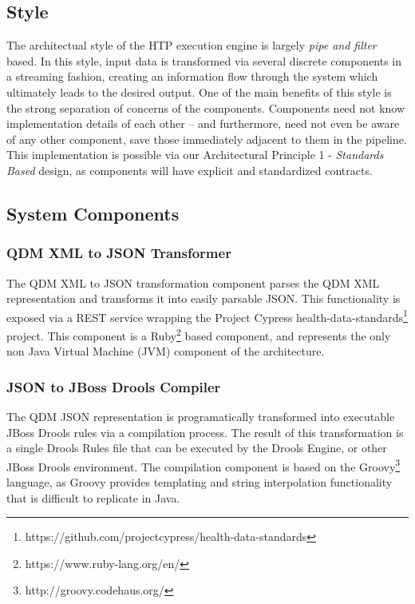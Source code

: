 \documentclass{amia}
\begin{document}
\subsection*{Style}
The architectual style of the HTP execution engine is largely \textit{pipe and filter} based. In this style, input data is transformed via several discrete components in a streaming fashion, creating an information flow through the system which ultimately leads to the desired output\cite{garlan1993introduction}. One of the main benefits of this style is the strong separation of concerns of the components. Components need not know implementation details of each other -- and furthermore, need not even be aware of any other component, save those immediately adjacent to them in the pipeline. This implementation is possible via our Architectural Principle 1 - \textit{Standards Based} design, as components will have explicit and standardized contracts.

\subsection*{System Components}
\subsubsection*{QDM XML to JSON Transformer}
The QDM XML to JSON transformation component parses the QDM XML representation and transforms it into easily parsable JSON. This functionality is exposed via a REST service wrapping the Project Cypress health-data-standards\footnote{https://github.com/projectcypress/health-data-standards} project. This component is a Ruby\footnote{https://www.ruby-lang.org/en/} based component, and represents the only non Java Virtual Machine (JVM) component of the architecture.

\subsubsection*{JSON to JBoss Drools Compiler}
The QDM JSON representation is programatically transformed into executable JBoss Drools rules via a compilation process. The result of this transformation is a single Drools Rules file that can be executed by the Drools Engine, or other JBoss Drools environment. The compilation component is based on the Groovy\footnote{http://groovy.codehaus.org/} language, as Groovy provides templating and string interpolation functionality that is difficult to replicate in Java.
\end{document}
